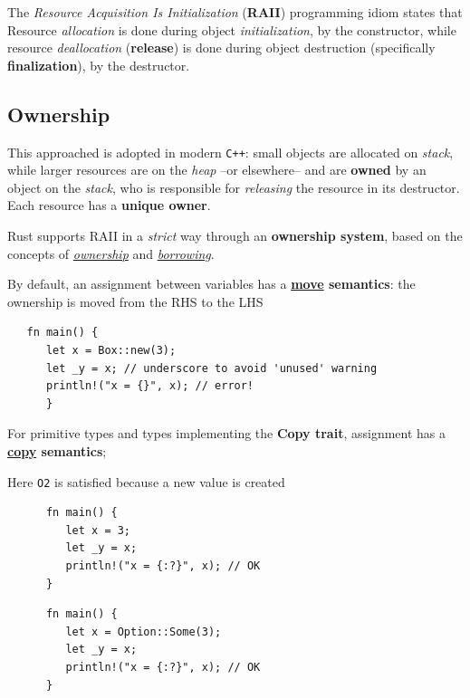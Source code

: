 The \textit{Resource Acquisition Is Initialization} (\textbf{RAII}) programming idiom states that Resource \textit{allocation} is done during object
\textit{initialization}, by the constructor, while resource \textit{deallocation}
(\textbf{release}) is done during object destruction (specifically
\textbf{finalization}), by the destructor.

\subsection{Ownership}

This approached is adopted in modern \texttt{C++}: 
small objects are allocated on \textit{stack},
while larger resources are on the \textit{heap} {--}or elsewhere{--} and are \textbf{owned} by an object on the \textit{stack},
who is responsible for \textit{releasing} the resource in its destructor.\\
Each resource has a \textbf{unique owner}.

Rust supports RAII in a \textit{strict} way through an \textbf{ownership system}, based on the concepts of \textit{\underline{ownership}} and \textit{\underline{borrowing}}.

By default, an assignment between variables has
a \textbf{\underline{move} semantics}:
the ownership is moved from the RHS to the LHS 
\begin{lstlisting}
   fn main() {
      let x = Box::new(3);
      let _y = x; // underscore to avoid 'unused' warning
      println!("x = {}", x); // error!
      }
\end{lstlisting}
For primitive types and types implementing the \textbf{Copy
trait}, assignment has a \textbf{\underline{copy} semantics};
\begin{center}
   Here \texttt{O2} is satisfied because a new value is created
\end{center}
\begin{paracol}{2}
   \begin{lstlisting}
      fn main() {
         let x = 3;
         let _y = x;
         println!("x = {:?}", x); // OK
      }
   \end{lstlisting}
   
   \switchcolumn

   \begin{lstlisting}
      fn main() {
         let x = Option::Some(3);
         let _y = x;
         println!("x = {:?}", x); // OK
      }
   \end{lstlisting}
\end{paracol}

